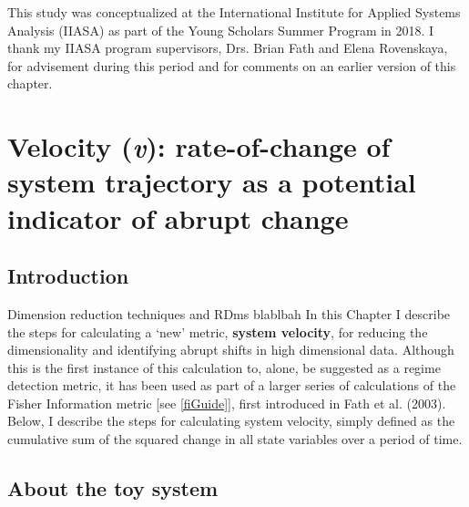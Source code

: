 \documentclass[12pt,twoside,openany]{reedthesis}
\begin{document}
This study was conceptualized at the International Institute for Applied Systems Analysis (IIASA) as part of the Young Scholars Summer Program in 2018. I thank my IIASA program supervisors, Drs. Brian Fath and Elena Rovenskaya, for advisement during this period and for comments on an earlier version of this chapter.

\hypertarget{velocity}{%
\chapter{\texorpdfstring{Velocity (\emph{v}): rate-of-change of system trajectory as a potential indicator of abrupt change}{Velocity (v): rate-of-change of system trajectory as a potential indicator of abrupt change}}\label{velocity}}

\hypertarget{introduction-4}{%
\section{Introduction}\label{introduction-4}}

Dimension reduction techniques and RDms blablbah
In this Chapter I describe the steps for calculating a `new' metric, \textbf{system velocity}, for reducing the dimensionality and identifying abrupt shifts in high dimensional data. Although this is the first instance of this calculation to, alone, be suggested as a regime detection metric, it has been used as part of a larger series of calculations of the Fisher Information metric {[}see \ref{fiGuide}{]}, first introduced in Fath et al. (2003). Below, I describe the steps for calculating system velocity, simply defined as the cumulative sum of the squared change in all state variables over a period of time.

\hypertarget{about-the-toy-system}{%
\section{About the toy system}\label{about-the-toy-system}}
\end{document}
